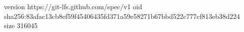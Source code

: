 version https://git-lfs.github.com/spec/v1
oid sha256:83afac13cb8ef59f45406435fd371a59e58271b67bbd522c777cf813eb38d224
size 316045
